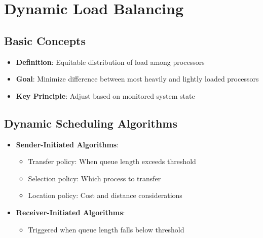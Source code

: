 \documentclass[12pt]{article}
\begin{document}
\section{Dynamic Load Balancing}

\subsection{Basic Concepts}
\begin{itemize}
  \item \textbf{Definition}: Equitable distribution of load among processors
  \item \textbf{Goal}: Minimize difference between most heavily and lightly loaded processors
  \item \textbf{Key Principle}: Adjust based on monitored system state
\end{itemize}

\subsection{Dynamic Scheduling Algorithms}
\begin{itemize}
  \item \textbf{Sender-Initiated Algorithms}:
        \begin{itemize}
          \item Transfer policy: When queue length exceeds threshold
          \item Selection policy: Which process to transfer
          \item Location policy: Cost and distance considerations
        \end{itemize}

  \item \textbf{Receiver-Initiated Algorithms}:
        \begin{itemize}
          \item Triggered when queue length falls below threshold
        \end{itemize}
\end{itemize}
\end{document}
